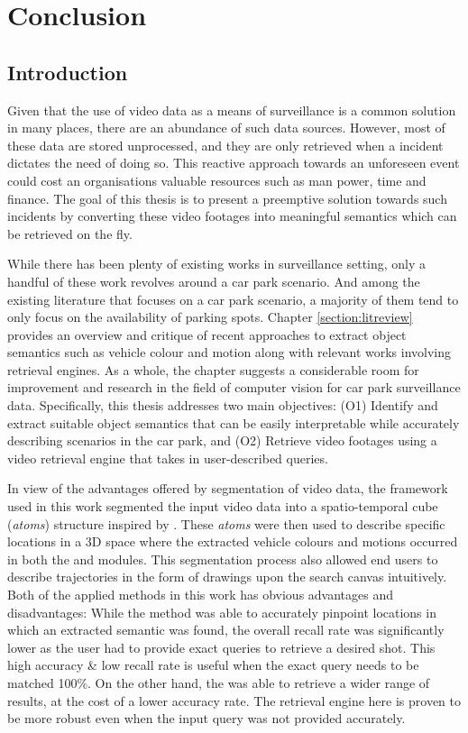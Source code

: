 
\chapter{Conclusion}
\label{section:conclusion}
\section*{Introduction}

Given that the use of video data as a means of surveillance is a common solution in many places, there are an abundance of such data sources. However, most of these data are stored unprocessed, and they are only retrieved when a incident dictates the need of doing so. 
This reactive approach towards an unforeseen event could cost an organisations valuable resources such as man power, time and finance. 
The goal of this thesis is to present a preemptive solution towards such incidents by converting these video footages into meaningful semantics which can be retrieved on the fly. 

While there has been plenty of existing works in surveillance setting, only a handful of these work revolves around a car park scenario. 
And among the existing literature that focuses on a car park scenario, a majority of them tend to only focus on the availability of parking spots. 
Chapter \ref{section:litreview} provides an overview and critique of recent approaches to extract object semantics such as vehicle colour and motion along with relevant works involving retrieval engines. As a whole, the chapter suggests a considerable room for improvement and research in the field of computer vision for car park surveillance data.
Specifically, this thesis addresses two main objectives: (O1) Identify and extract suitable object semantics that can be easily interpretable while accurately describing scenarios in the car park, and (O2) Retrieve video footages using a video retrieval engine that takes in user-described queries. 

In view of the advantages offered by segmentation of video data, the framework used in this work segmented the input video data into a spatio-temporal cube (\textit{atoms}) structure inspired by \cite{castanon2016retrieval}. These \textit{atoms} were then used to describe specific locations in a 3D space where the extracted vehicle colours and motions occurred in both the \versionOneExt and \versionTwoExt modules. This segmentation process also allowed end users to describe trajectories in the form of drawings upon the search canvas intuitively. Both of the applied methods in this work has obvious advantages and disadvantages: While the \versionOneRet method was able to accurately pinpoint locations in which an extracted semantic was found, the overall recall rate was significantly lower as the user had to provide exact queries to retrieve a desired shot. This high accuracy \& low recall rate is useful when the exact query needs to be matched 100\%. On the other hand, the \versionTwoRet was able to retrieve a wider range of results, at the cost of a lower accuracy rate. The retrieval engine here is proven to be more robust even when the input query was not provided accurately. 

